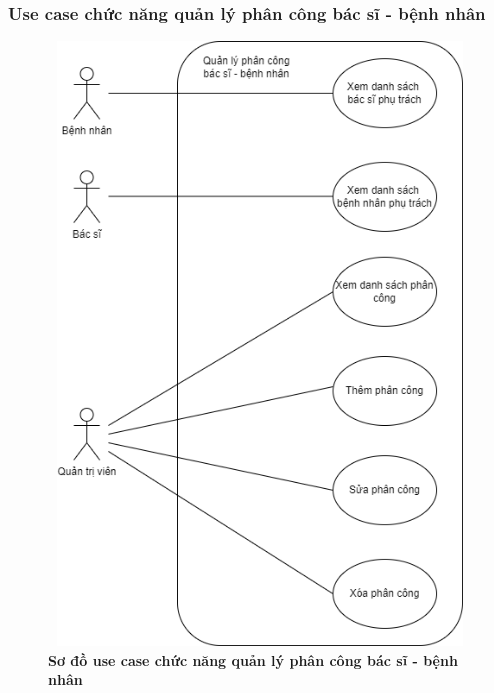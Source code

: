   \subsubsection{Use case chức năng quản lý phân công bác sĩ - bệnh nhân}
  \begin{figure}[H]
    \centering
    \includegraphics[width=12cm,height=16cm]{Images/use_case/use_case_manage_pda.png}
    \caption[Sơ đồ use case chức năng quản lý phân công bác sĩ - bệnh nhân]{\bfseries \fontsize{12pt}{0pt}
    \selectfont Sơ đồ use case chức năng quản lý phân công bác sĩ - bệnh nhân}
    \label{use_case_pda_management} %
  \end{figure}

